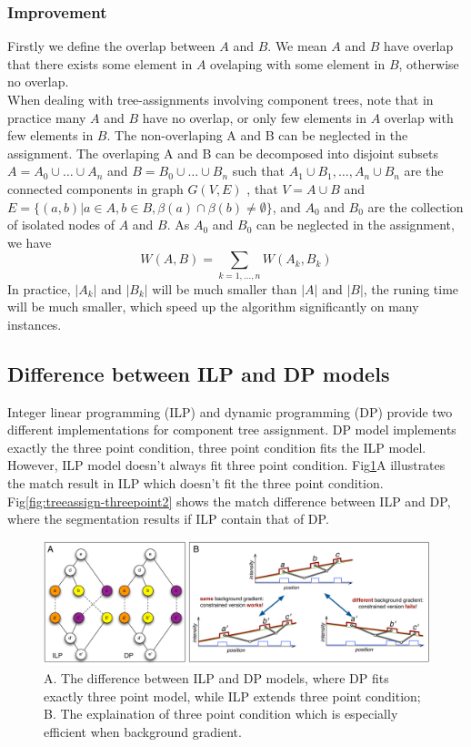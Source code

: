 \subsubsection{Improvement}
Firstly we define the overlap between $A$ and $B$. We mean $A$ and $B$ have overlap that there exists some element in $A$ ovelaping with some element in $B$, otherwise no overlap.\\ 
When dealing with tree-assignments involving component trees, note that in practice many $A$ and $B$ have no overlap, or only few elements in $A$ overlap with few elements in $B$. The non-overlaping A and B can be neglected in the assignment. The overlaping A and B can be decomposed into disjoint subsets $A=A_0 \cup \ldots \cup A_n$ and $B = B_0 \cup \ldots \cup B_n$ such that $A_1 \cup B_1, \ldots, A_n \cup B_n$ are the connected components in graph $G(V, E)$ , that $V = A \cup B$ and $E = \{(a,b)|a \in A, b \in B, \beta(a) \cap \beta(b) \neq \emptyset\}$,  and $A_0$ and $B_0$ are the collection of isolated nodes of $A$ and $B$. As $A_0$ and $B_0$ can be neglected in the assignment, we have 
\begin{equation*} \label{eqn:ldcp-decomp}
W(A,B) = \sum_{k=1,\ldots,n}{W(A_k, B_k)}
\end{equation*}
In practice, $|A_k|$ and $|B_k|$ will be much smaller than $|A|$ and $|B|$, the runing time will be much smaller, which speed up the algorithm significantly on many instances.
\subsection{Difference between ILP and DP models}
Integer linear programming (ILP) and dynamic programming (DP) provide two different implementations for component tree assignment. DP model implements exactly the three point condition, three point condition fits the ILP model. However, ILP model doesn't always fit three point condition. Fig\ref{fig:treeassign-threepoint}A illustrates the match result in ILP which doesn't fit the three point condition. Fig\ref{fig:treeassign-threepoint2} shows the match difference between ILP and DP, where the segmentation results if ILP contain that of DP.

\begin{figure}[htbp]
\centering
\includegraphics[width=1.0\textwidth]{images/treeassign_threepoint}
\caption[Three point condition]{A. The difference between ILP and DP models, where DP fits exactly three point model, while ILP extends three point condition; B. The explaination of three point condition which is especially efficient when background gradient.}
\label{fig:treeassign-threepoint}
\end{figure}

